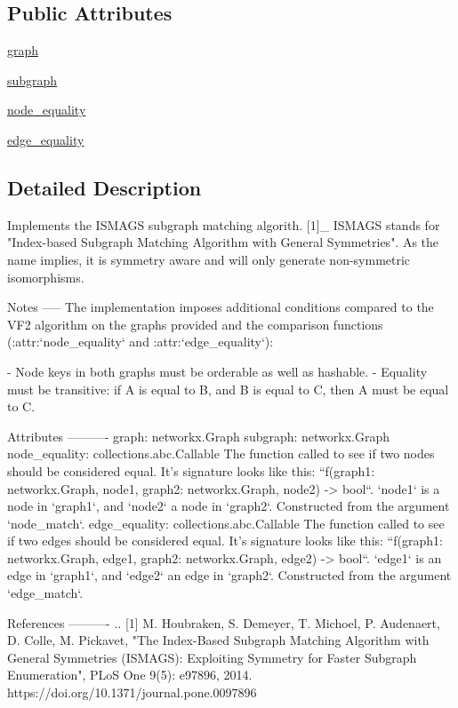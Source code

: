 \subsection*{Public Attributes}
\begin{DoxyCompactItemize}
\item 
\hyperlink{classnetworkx_1_1algorithms_1_1isomorphism_1_1ismags_1_1ISMAGS_aecadf72dedcab3af3a1f87d4b2b0c398}{graph}
\item 
\hyperlink{classnetworkx_1_1algorithms_1_1isomorphism_1_1ismags_1_1ISMAGS_a72e8b9194381ecd1760f122c47741002}{subgraph}
\item 
\hyperlink{classnetworkx_1_1algorithms_1_1isomorphism_1_1ismags_1_1ISMAGS_a7f2ae2177b5be5838c831daef9ae1653}{node\+\_\+equality}
\item 
\hyperlink{classnetworkx_1_1algorithms_1_1isomorphism_1_1ismags_1_1ISMAGS_ac62efe437e1d335d6a5267dd942df2df}{edge\+\_\+equality}
\end{DoxyCompactItemize}


\subsection{Detailed Description}
\begin{DoxyVerb}Implements the ISMAGS subgraph matching algorith. [1]_ ISMAGS stands for
"Index-based Subgraph Matching Algorithm with General Symmetries". As the
name implies, it is symmetry aware and will only generate non-symmetric
isomorphisms.

Notes
-----
The implementation imposes additional conditions compared to the VF2
algorithm on the graphs provided and the comparison functions
(:attr:`node_equality` and :attr:`edge_equality`):

 - Node keys in both graphs must be orderable as well as hashable.
 - Equality must be transitive: if A is equal to B, and B is equal to C,
   then A must be equal to C.

Attributes
----------
graph: networkx.Graph
subgraph: networkx.Graph
node_equality: collections.abc.Callable
    The function called to see if two nodes should be considered equal.
    It's signature looks like this:
    ``f(graph1: networkx.Graph, node1, graph2: networkx.Graph, node2) -> bool``.
    `node1` is a node in `graph1`, and `node2` a node in `graph2`.
    Constructed from the argument `node_match`.
edge_equality: collections.abc.Callable
    The function called to see if two edges should be considered equal.
    It's signature looks like this:
    ``f(graph1: networkx.Graph, edge1, graph2: networkx.Graph, edge2) -> bool``.
    `edge1` is an edge in `graph1`, and `edge2` an edge in `graph2`.
    Constructed from the argument `edge_match`.

References
----------
.. [1] M. Houbraken, S. Demeyer, T. Michoel, P. Audenaert, D. Colle,
   M. Pickavet, "The Index-Based Subgraph Matching Algorithm with General
   Symmetries (ISMAGS): Exploiting Symmetry for Faster Subgraph
   Enumeration", PLoS One 9(5): e97896, 2014.
   https://doi.org/10.1371/journal.pone.0097896
\end{DoxyVerb}
 

